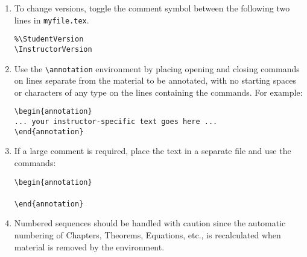 \begin{enumerate}


\item To change versions, toggle the comment symbol between the following two lines in \texttt{myfile.tex}.

\begin{center}
\verb|%\StudentVersion|\\
\verb|\InstructorVersion|\\
\end{center}

\item Use the \verb|\annotation| environment by placing opening and closing commands on lines
separate from the material to be annotated, with no starting spaces or characters of any type
on the lines containing the commands.  For example:

\begin{center}
\verb|\begin{annotation}|\\
\verb|... your instructor-specific text goes here ...|\\
\verb|\end{annotation}| \\
\end{center}


\item If a large comment is required, place the text in a separate file and use the commands:

\begin{center}
 \verb|\begin{annotation}|\\
 \verb||\\
 \verb|\end{annotation}|\\
\end{center}

\item Numbered sequences should be handled with caution
since the automatic numbering of Chapters, Theorems, Equations, etc., is recalculated when
material is removed by the environment.


\end{enumerate}
